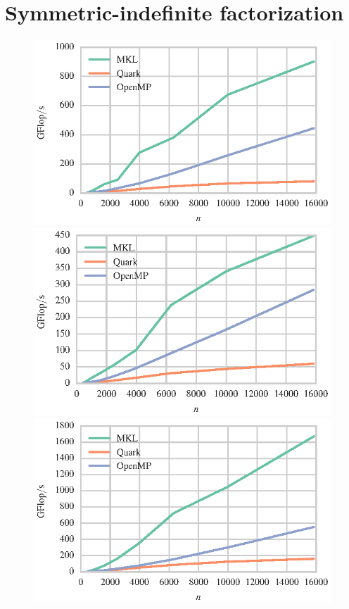 \documentclass[a4paper,12pt]{article}
\begin{document}
\section{Symmetric-indefinite factorization}
\label{sec.ldlt}
\begin{figure}[t]
  \centering
  \includegraphics[scale=.85]{fig/kebnekaise_zhetrf_weak_scaling.eps}
  \includegraphics[scale=.85]{fig/kebnekaise_dsytrf_weak_scaling.eps}
  \includegraphics[scale=.85]{fig/kebnekaise_chetrf_weak_scaling.eps}

\end{figure}
\end{document}
